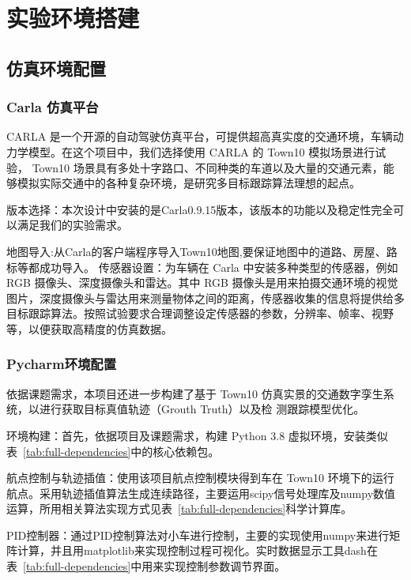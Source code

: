 \chapter{实验环境搭建}

\section{仿真环境配置}

\subsection{Carla 仿真平台}


CARLA 是一个开源的自动驾驶仿真平台，可提供超高真实度的交通环境，车辆动力学模型。在这个项目中，我们选择使用 CARLA 的 Town10 模拟场景进行试验， Town10 场景具有多处十字路口、不同种类的车道以及大量的交通元素，能够模拟实际交通中的各种复杂环境，是研究多目标跟踪算法理想的起点。

版本选择：本次设计中安装的是Carla0.9.15版本，该版本的功能以及稳定性完全可以满足我们的实验需求。

地图导入:从Carla的客户端程序导入Town10地图,要保证地图中的道路、房屋、路标等都成功导入。
传感器设置：为车辆在 Carla 中安装多种类型的传感器，例如 RGB 摄像头、深度摄像头和雷达。其中 RGB 摄像头是用来拍摄交通环境的视觉图片，深度摄像头与雷达用来测量物体之间的距离，传感器收集的信息将提供给多目标跟踪算法。按照试验要求合理调整设定传感器的参数，分辨率、帧率、视野等，以便获取高精度的仿真数据。



\subsection{Pycharm环境配置}

依据课题需求，本项目还进一步构建了基于 Town10 仿真实景的交通数字孪生系统，以进行获取目标真值轨迹（Grouth Truth）以及检 测跟踪模型优化。

环境构建：首先，依据项目及课题需求，构建 Python 3.8 虚拟环境，安装类似表~\ref{tab:full-dependencies}中的核心依赖包。

航点控制与轨迹插值：使用该项目航点控制模块得到车在 Town10 环境下的运行航点。采用轨迹插值算法生成连续路径，主要运用scipy信号处理库及numpy数值运算，所用相关算法实现方式见表~\ref{tab:full-dependencies}科学计算库。

PID控制器：通过PID控制算法对小车进行控制，主要的实现使用numpy来进行矩阵计算，并且用matplotlib来实现控制过程可视化。实时数据显示工具dash在表~\ref{tab:full-dependencies}中用来实现控制参数调节界面。


